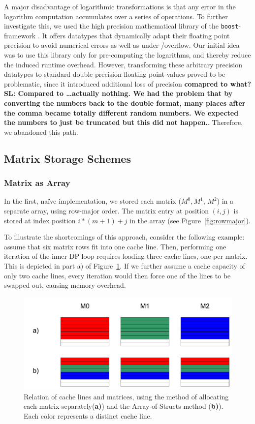\documentclass[runningheads,a4paper]{llncs}
\begin{document}
A major disadvantage of logarithmic transformations is that any error in the logarithm computation accumulates over a series of operations. 
To further investigate this, we used the high precision mathematical library of the \texttt{boost}-framework \cite{boost}. 
It offers datatypes that dynamically adapt their floating point precision to avoid numerical errors as well as under-/overflow. 
Our initial idea was to use this library only for pre-computing the logarithms, and thereby reduce the induced runtime overhead. 
However, transforming these arbitrary precision datatypes to standard double precision floating point values proved to be problematic, since 
it introduced additional loss of precision {\bf comapred to what? SL: Compared to \ldots actually nothing. We had the problem that by converting the numbers back to the double format, many places after the comma became totally different random numbers. We expected the numbers to just be truncated but this did not happen.}. Therefore, we abandoned this path.

\subsection{Matrix Storage Schemes}
\label{sec:caching}

\subsubsection{Matrix as Array}
In the first, na\"ive implementation, we stored each matrix ($M^0, M^1$, $M^2$) in a separate array, using row-major order. 
The matrix entry at position $(i,j)$ is stored at index position $i*(m+1)+j$ in the array (see Figure~\ref{fig:rowmajor}).

To illustrate the shortcomings of this approach, consider the following example: assume that six matrix rows fit into one cache line. 
Then, performing one iteration of the inner DP loop requires loading three cache lines, one per matrix. 
This is depicted in part a) of Figure~\ref{fig:cachelines}.
If we further assume a cache capacity of only two cache lines, 
every iteration would then force one of the lines to be swapped out, causing memory overhead.

\begin{figure}
\centering
\includegraphics[width=\textwidth]{images/cachelines.pdf}
\caption{Relation of cache lines and matrices, using the method of allocating each matrix separately(\textbf{a)}) and the Array-of-Structs method (\textbf{b)}). 
Each color represents a distinct cache line.}
\label{fig:cachelines}
\end{figure}
\end{document}
